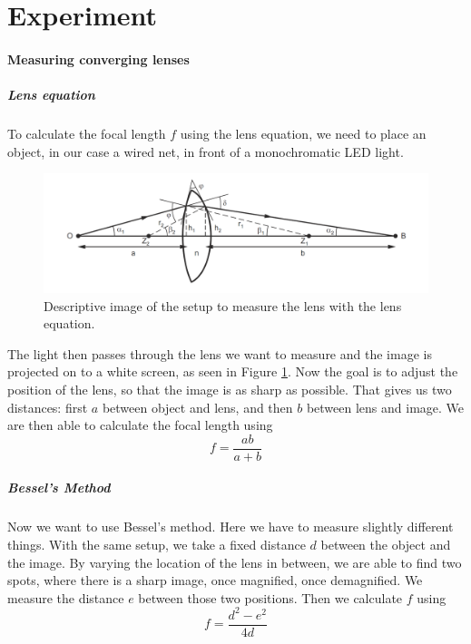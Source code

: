 \section{Experiment}

\paragraph{Measuring converging lenses}
\subparagraph{Lens equation}
\label{chap::lens}

To calculate the focal length $f$ using the lens equation, we need to place an object, in our case a wired net, in front of a monochromatic LED light. 

\begin{figure}[ht]
	\centering
	\includegraphics[width=\textwidth]{img/lenseq.PNG}
	\caption{Descriptive image\cite{manual} of the setup to measure the lens with the lens equation.}
	\label{fig::lens}
\end{figure}

The light then passes through the lens we want to measure and the image is projected on to a white screen, as seen in Figure \ref{fig::lens}.
Now the goal is to adjust the position of the lens, so that the image is as sharp as possible.
That gives us two distances:
first $a$ between object and lens, and then $b$ between lens and image.
We are then able to calculate the focal length using
\begin{equation}
	\displaystyle f = \frac{ab}{a+b}
\end{equation}





\subparagraph{Bessel's Method}
\label{chap::bessel}
Now we want to use Bessel's method.
Here we have to measure slightly different things.
With the same setup, we take a fixed distance $d$ between the object and the image. 
By varying the location of the lens in between, we are able to find two spots, where there is a sharp image, once magnified, once demagnified.
We measure the distance $e$ between those two positions.
Then we calculate $f$ using
\begin{equation}
	f = \frac{d^2 - e^2}{4d}
\end{equation}

